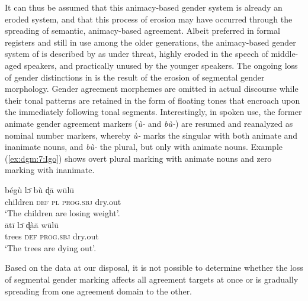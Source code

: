 \documentclass[output=collectionpaper]{langsci/langscibook}
\begin{document}
It can thus be assumed that this animacy-based gender system is already an eroded system, and that this process of erosion may have occurred through the spreading of semantic, animacy-based agreement. Albeit preferred in formal registers and still in use among the older generations, the animacy-based gender system of  is described by \citet{Gblem-Poidi2007} as under threat, highly eroded in the speech of middle-aged speakers, and practically unused by the younger speakers. The ongoing loss of gender distinctions in  is the result of the erosion of segmental gender morphology. Gender agreement morphemes are omitted in actual discourse while their tonal patterns are retained in the form of floating tones that encroach upon the immediately following tonal segments. Interestingly, in spoken use, the former animate gender agreement markers (\textit{\`u-} and \textit{b\`u-}) are resumed and reanalyzed as nominal number markers, whereby \textit{\`u-} marks the singular with both animate and inanimate nouns, and \textit{b\`u-} the plural, but only with animate nouns. Example (\ref{ex:dgm:7:Igo}) shows overt plural marking with animate nouns and zero marking with inanimate.

\ea\label{ex:dgm:7:Igo}
\ea
\gll b\'eg\`u l\={ɔ} b\`u ɖ\={a} w\={u}l\={u}\\
children \textsc{def} \textsc{pl} \textsc{prog.sbj} dry.out\\
\glt `The children are losing weight'.\\
\ex
\gll \={a}t\={i} l\={ɔ} ɖ\`a\={a} w\={u}l\={u}\\
trees \textsc{def} \textsc{prog.sbj} dry.out \\
\glt `The trees are dying out'.
\z
\z

Based on the data at our disposal, it is not possible to determine whether the loss of segmental gender marking affects all agreement targets at once or is gradually spreading from one agreement domain to the other.
\end{document}
